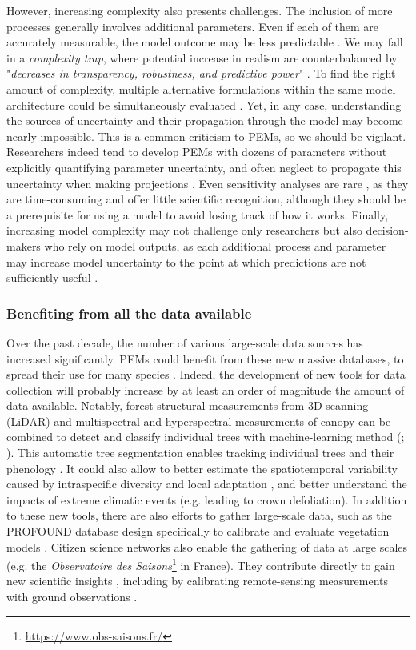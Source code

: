 However, increasing complexity also presents challenges. The inclusion of more processes generally involves additional parameters. Even if each of them are accurately measurable, the model outcome may be less predictable \citep{Levins1993}. We may fall in a \emph{complexity trap}, where potential increase in realism are counterbalanced by "\emph{decreases in transparency, robustness, and predictive power}" \citep{Franklin2020}. To find the right amount of complexity, multiple alternative formulations within the same model architecture could be simultaneously evaluated \citep{Huber2020}. Yet, in any case, understanding the sources of uncertainty and their propagation through the model may become nearly impossible. This is a common criticism to PEMs, so we should be vigilant. Researchers indeed tend to develop PEMs with dozens of parameters without explicitly quantifying parameter uncertainty, and often neglect to propagate this uncertainty when making projections \citep{Dietze2017}. Even sensitivity analyses are rare \citep[e.g.][]{Huber2018}, as they are time-consuming and offer little scientific recognition, although they should be a prerequisite for using a model to avoid losing track of how it works. Finally, increasing model complexity may not challenge only researchers but also decision-makers who rely on model outputs, as each additional process and parameter may increase model uncertainty to the point at which predictions are not sufficiently useful \citep{Saltelli2020}.

\subsubsection{Benefiting from all the data available}

Over the past decade, the number of various large-scale data sources has increased significantly. PEMs could benefit from these new massive databases, to spread their use for many species \citep{Evans2016}. Indeed, the development of new tools for data collection will probably increase by at least an order of magnitude the amount of data available. Notably, forest structural measurements from 3D scanning (LiDAR) and multispectral and hyperspectral measurements of canopy can be combined to detect and classify individual trees with machine-learning method (; \citealp{Maeyrae2021, Ma2024}). This automatic tree segmentation enables tracking individual trees and their phenology \citep{Berra2019}. It could also allow to better estimate the spatiotemporal variability caused by intraspecific diversity and local adaptation \citep{Randin2020}, and better understand the impacts of extreme climatic events (e.g. leading to crown defoliation). In addition to these new tools, there are also efforts to gather large-scale data, such as the PROFOUND database design specifically to calibrate and evaluate vegetation models \citep{Reyer2020}. Citizen science networks also enable the gathering of data at large scales (e.g. the \emph{Observatoire des Saisons}\footnote{\url{https://www.obs-saisons.fr/}} in France). They contribute directly to gain new scientific insights \citep[e.g.][]{Asse2018}, including by calibrating remote-sensing measurements with ground observations \citep{Xu2024}.

